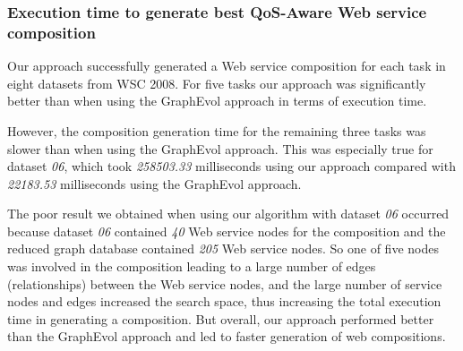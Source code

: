 \subsubsection{Execution time to generate best QoS-Aware Web service composition} 
Our approach successfully generated a Web service composition for each task in eight datasets from WSC 2008. For five tasks our approach was significantly better than when using the GraphEvol approach in terms of execution time.\par

However, the composition generation time for the remaining three tasks was slower than when using the GraphEvol approach. This was especially true for dataset \emph{06}, which took \emph{258503.33} milliseconds using our approach compared with \emph{22183.53} milliseconds using the GraphEvol approach.\par

The poor result we obtained when using our algorithm with dataset \emph{06} occurred because dataset \emph{06} contained \emph{40} Web service nodes for the composition and the reduced graph database contained \emph{205} Web service nodes. So one of five nodes was involved in the composition leading to a large number of edges (relationships) between the Web service nodes, and the large number of service nodes and edges increased the search space, thus increasing the total execution time in generating a composition. But overall, our approach performed better than the GraphEvol approach and led to faster generation of web compositions.\par



